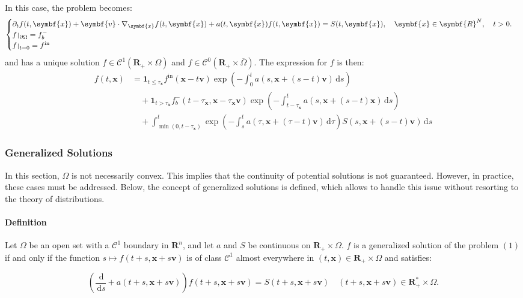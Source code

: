 \documentclass[a4paper, 11pt]{article}
\newcommand{\bm}{\symbf}
\newcommand{\di}{\ensuremath{\, \mathrm{d}}}
\def\restriction#1#2{\mathchoice
	{\setbox1\hbox{${\displaystyle #1}_{\scriptstyle #2}$}
		\restrictionaux{#1}{#2}}
	{\setbox1\hbox{${\textstyle #1}_{\scriptstyle #2}$}
		\restrictionaux{#1}{#2}}
	{\setbox1\hbox{${\scriptstyle #1}_{\scriptscriptstyle #2}$}
		\restrictionaux{#1}{#2}}
	{\setbox1\hbox{${\scriptscriptstyle #1}_{\scriptscriptstyle #2}$}
		\restrictionaux{#1}{#2}}}
\def\restrictionaux#1#2{{#1\,\smash{\vrule height .8\ht1 depth .85\dp1}}_{\,#2}}
\begin{document}
In this case, the problem becomes:
\[
\begin{cases}
\partial_t f(t,\bm{x})+\bm{v} \cdot \nabla_{\bm{x}} f(t,\bm{x})+ a(t,\bm{x})f(t,\bm{x})=S(t,\bm{x}), \quad \bm{x} \in \bm{R}^N, \quad t>0.\\
\restriction{f}{\partial \Omega}= f_b^-\\
\restriction{f}{t=0}= f^{\mathrm{in}}
\end{cases}
\]
and has a unique solution $f \in \mathcal{C}^1(\bm{R}_+ \times \Omega)$ and $f \in \mathcal{C}^0(\bm{R}_+ \times \overline{\Omega})$. The expression for $f$ is then:
\[
\boxed{
	\begin{aligned}
	f(t,\bm{x}) &= \mathbf{1}_{t \leq \tau_{\bm{x}}} f^{\mathrm{in}} (\bm{x}-t\bm{v}) \exp\left(-\int_0^t a(s,\bm{x}+(s-t)\bm{v})\di s\right) \\
	&\quad + \mathbf{1}_{t > \tau_{\bm{x}}} f_b^- (t-\tau_{\bm{x}},\bm{x}-\tau_{\bm{x}} \bm{v}) \exp\left(-\int_{t-\tau_{\bm{x}}}^t a(s,\bm{x}+(s-t)\bm{x})\di s\right) \\
	&\quad + \int_{\min(0,t-\tau_{\bm{x}})}^t \exp\left(-\int_{s}^{t}a(\tau,\bm{x}+(\tau-t)\bm{v})\di\tau\right) S(s,\bm{x}+(s-t)\bm{v})\di s
	\end{aligned}}
\]

\subsubsection{Generalized Solutions}

In this section, $\Omega$ is not necessarily convex. This implies that the continuity of potential solutions is not guaranteed. However, in practice, these cases must be addressed. Below, the concept of generalized solutions is defined, which allows to handle this issue without resorting to the theory of distributions.

\paragraph{Definition}

Let $\Omega$ be an open set with a $\mathcal{C}^1$ boundary in $\bm{R}^n$, and let $a$ and $S$ be continuous on $\bm{R}_+ \times \Omega$. $f$ is a generalized solution of the problem $(1)$ if and only if the function $s \mapsto f(t+s,\bm{x}+s\bm{v})$ is of class $\mathcal{C}^1$ almost everywhere in $(t,\bm{x}) \in \bm{R}_+ \times \Omega$ and satisfies:

\begin{equation}
\left(\frac{\di}{\di s} +a(t+s,\bm{x}+s\bm{v})\right)f(t+s,\bm{x}+s\bm{v}) = S(t+s,\bm{x}+s\bm{v}) \quad (t+s,\bm{x}+s\bm{v}) \in \bm{R}_+^* \times \Omega.
\end{equation}
\end{document}
